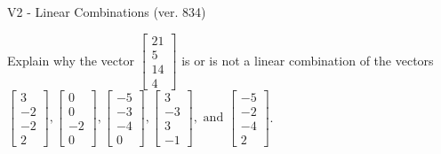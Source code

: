\begin{exercise}
  \begin{exerciseTitle}V2 - Linear Combinations (ver. 834)\end{exerciseTitle}
  \begin{exerciseStatement}
    Explain why the vector \(\left[\begin{array}{c}
21 \\
5 \\
14 \\
4
\end{array}\right]\)  is or is not a linear 
	combination of the vectors \(\left[\begin{array}{c}
3 \\
-2 \\
-2 \\
2
\end{array}\right] , \left[\begin{array}{c}
0 \\
0 \\
-2 \\
0
\end{array}\right] , \left[\begin{array}{c}
-5 \\
-3 \\
-4 \\
0
\end{array}\right] , \left[\begin{array}{c}
3 \\
-3 \\
3 \\
-1
\end{array}\right] , \text{ and } \left[\begin{array}{c}
-5 \\
-2 \\
-4 \\
2
\end{array}\right]\).
	



\end{exerciseStatement}
\end{exercise}
